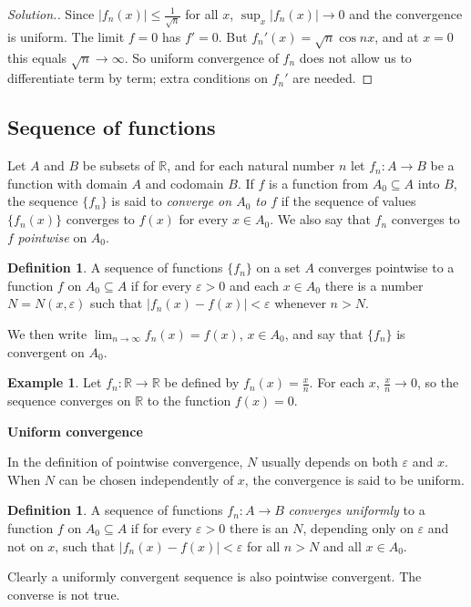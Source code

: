 \documentclass[11pt,a4paper]{article}
\numberwithin{equation}{section}
\theoremstyle{definition}
\newtheorem{defn}[thm]{Definition}
\newtheorem{exa}[thm]{Example}
\newenvironment{solution}
  {\renewcommand{\qedsymbol}{}\begin{proof}[\textit{Solution}.]}
  {\end{proof}}
\newcommand{\subhead}[1]{%
  \par\medskip\noindent\textbf{#1}\par\nobreak\smallskip}
\begin{document}
\begin{solution}
Since $|f_n(x)|\leq\frac{1}{\sqrt{n}}$ for all $x$, $\sup_x|f_n(x)|\longrightarrow0$ and the convergence is uniform. The limit $f = 0$ has $f' = 0$. But $f_n'(x) = \sqrt{n}\cos nx$, and at $x = 0$ this equals $\sqrt{n}\longrightarrow\infty$. So uniform convergence of $f_n$ does not allow us to differentiate term by term; extra conditions on $f_n'$ are needed.
\end{solution}


\subsection{Sequence of functions}

Let $A$ and $B$ be subsets of $\mathbb{R}$, and for each natural number $n$ let $f_n: A\longrightarrow B$ be a function with domain $A$ and codomain $B$. If $f$ is a function from $A_0\subseteq A$ into $B$, the sequence $\{f_n\}$ is said to \emph{converge on $A_0$ to $f$} if the sequence of values $\{f_n(x)\}$ converges to $f(x)$ for every $x\in A_0$. We also say that $f_n$ converges to $f$ \emph{pointwise} on $A_0$.


\begin{defn}
A sequence of functions $\{f_n\}$ on a set $A$ converges pointwise to a function $f$ on $A_0\subseteq A$ if for every $\varepsilon > 0$ and each $x\in A_0$ there is a number $N = N(x,\varepsilon)$ such that $|f_n(x) - f(x)| < \varepsilon$ whenever $n>N$.

We then write $\lim_{n\rightarrow \infty} f_n(x) = f(x)$, $x\in A_0$, and say that $\{f_n\}$ is convergent on $A_0$.
\end{defn}


\begin{exa}
Let $f_n : \mathbb{R}\longrightarrow \mathbb{R}$ be defined by $f_n(x) = \frac{x}{n}$. For each $x$, $\frac{x}{n}\longrightarrow 0$, so the sequence converges on $\mathbb{R}$ to the function $f(x) = 0$.
\end{exa}

\subhead{Uniform convergence}
In the definition of pointwise convergence, $N$ usually depends on both $\varepsilon$ and $x$. When $N$ can be chosen independently of $x$, the convergence is said to be uniform.


\begin{defn}
A sequence of functions $f_n: A\longrightarrow B$ \emph{converges uniformly} to a function $f$ on $A_0\subseteq A$ if for every $\varepsilon > 0$ there is an $N$, depending only on $\varepsilon$ and not on $x$, such that $|f_n(x) - f(x)| < \varepsilon$ for all $n> N$ and all $x\in A_0$.

Clearly a uniformly convergent sequence is also pointwise convergent. The converse is not true.
\end{defn}
\end{document}

